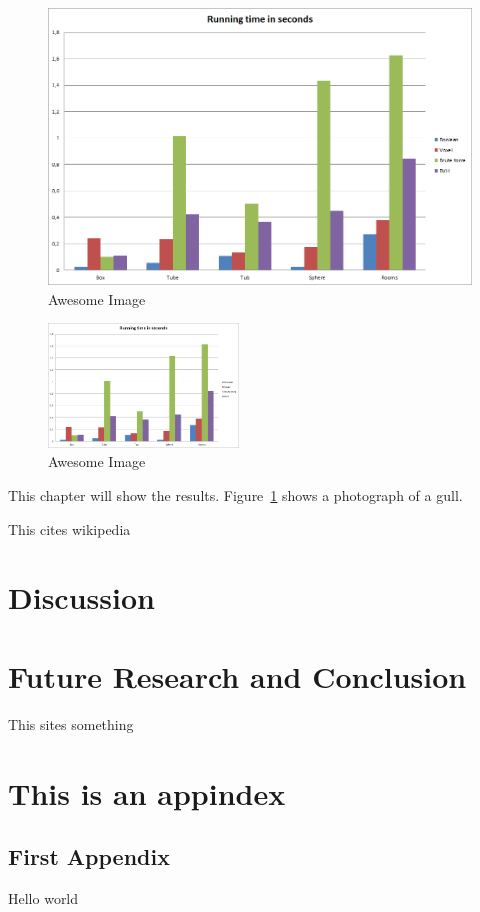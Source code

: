 \documentclass[11pt,twoside,a4paper]{report}
\begin{document}
\begin{figure}[h]
    \centering
    \includegraphics[width=0.45\linewidth]{images/running_time_seconds}
    \caption{Awesome Image}
    \label{fig:awesome_image1}
\end{figure}
\begin{figure}[h]
    \centering
    \includegraphics[width=0.45\textwidth]{images/running_time_seconds}
    \caption{Awesome Image}
    \label{fig:awesome_image2}
\end{figure}

This chapter will show the results. Figure~\ref{fig:awesome_image1} shows a photograph of a gull.

This \cite{wiki:123} cites wikipedia
\chapter{Discussion}

\chapter{Future Research and Conclusion}
This \cite{amanatides1987fast} sites something




\listoffigures
\listoftables
\appendix
\chapter{This is an appindex}
\section{First Appendix}
Hello world
\end{document}
